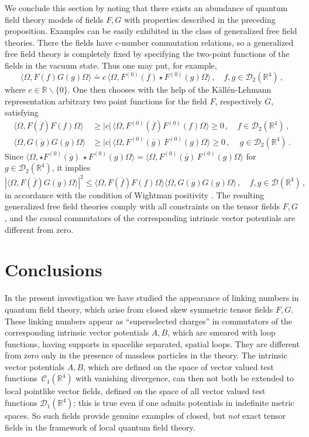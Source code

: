 \documentclass[11pt]{article}
\numberwithin{equation}{section}
\newcommand{\RR}{{\mathbb R}}
\newcommand{\Cc}{{\mathcal{C}}}
\newcommand{\Dc}{{\mathcal{D}}}
\begin{document}
\medskip
We conclude this section by noting that there exists an 
abundance of quantum field theory models of fields $F,G$ with 
properties described in the preceding proposition. Examples 
can be easily exhibited in the class of generalized free field
theories. There the fields have c-number commutation
relations, so a generalized free field theory is completely fixed by 
specifying the two-point functions of the 
fields in the vacuum state. Thus one may put, for example, 
$$
\langle \Omega, F(f) G(g) \Omega \rangle 
\doteq c \, \langle \Omega, F^{(0)}(f) \star \! F^{(0)}(g) \Omega \rangle 
\, ,  \quad f,g \in \Dc_2(\RR^4) \, ,
$$
where $c \in \RR \backslash \{ 0 \}$. One then chooses with the help of
the K\"all\'en-Lehmann representation arbitrary two point functions for the 
field $F$, respectively $G$, satisfying
\begin{align*}
\langle \Omega, F(\overline f) F(f) \Omega \rangle 
& \geq |c| \, \langle \Omega, F^{(0)}(\overline f) F^{(0)}(f) \Omega \rangle 
\geq 0 \, , \quad  f \in \Dc_2(\RR^4) \, , \\
\langle \Omega, G(\overline g) G(g) \Omega \rangle 
& \geq |c| \, \langle \Omega, F^{(0)}(\overline g) \, F^{(0)}(g) \Omega \rangle 
\geq 0 \, , \, \quad g \in \Dc_2(\RR^4) \, .
\end{align*}
Since 
$\langle \Omega, \star F^{(0)}(\overline g) \, \star \! F^{(0)}(g) \Omega \rangle
= \langle \Omega, F^{(0)}(\overline g) \, F^{(0)}(g) \Omega \rangle$ 
for $g \in \Dc_2(\RR^4)$, it implies  
$$
|\langle \Omega, F(\overline f) G(g) \Omega \rangle|^2 
\leq \langle \Omega, F(\overline f) F(f) \Omega \rangle 
\langle \Omega, G(\overline g) G(g) \Omega \rangle \, ,
\quad f,g \in \Dc(\RR^4) \, , 
$$
in accordance with the condition of Wightman positivity \cite{StWi}. 
The resulting generalized free field theories comply with 
all constraints on the tensor fields $F,G$, 
and the causal commutators of the corresponding intrinsic 
vector potentials are different from zero.

\section{Conclusions}
\label{sec6}

In the present investigation we have studied the appearance of
linking numbers in quantum field theory, which arise from closed 
skew symmetric tensor fields $F,G$. These linking numbers appear 
as ``superselected charges'' in commutators
of the corresponding intrinsic vector potentials $A,B$, which are
smeared with loop functions, having supports in spacelike separated,
spatial loops. They are different from zero only in the presence
of massless particles in the theory. The intrinsic vector potentials 
$A,B$, which are defined on the space of vector valued test 
functions~$\Cc_1(\RR^4)$ with vanishing divergence, 
can then not both be extended to 
local pointlike vector fields, defined on the space of all vector valued
test functions $\Dc_1(\RR^4)$; this is true even if one admits potentials in 
indefinite metric spaces. So such fields provide genuine examples of 
closed, but \textit{not} exact tensor fields in the framework of local 
quantum field theory. 
\end{document}
